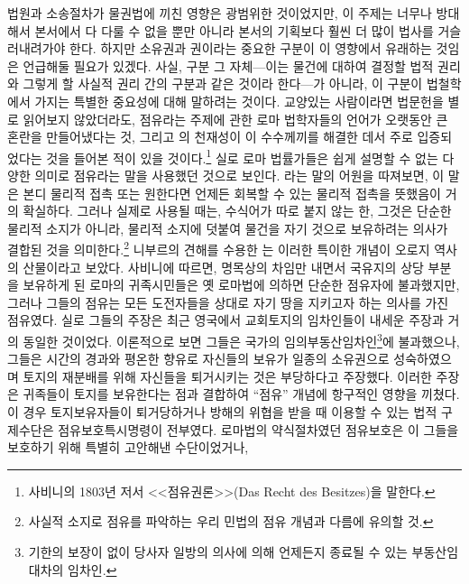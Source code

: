 법원과 소송절차가 물권법에 끼친 영향은 광범위한 것이었지만,
이 주제는 너무나 방대해서 본서에서 다 다룰 수 없을 뿐만 아니라
본서의 기획보다 훨씬 더 많이 법사를 거슬러내려가야 한다.
하지만 소유권과 권이라는 중요한 구분이 이 영향에서
유래하는 것임은 언급해둘 필요가 있겠다.
사실, 구분 그 자체---이는
물건에 대하여 결정할 법적 권리와
그렇게 할 사실적 권리 간의 구분과
같은 것이라 한다---가 아니라,
이 구분이 법철학에서 가지는 특별한 중요성에 대해 말하려는 것이다.
교양있는 사람이라면 법문헌을 별로 읽어보지 않았더라도,
점유라는 주제에 관한
로마 법학자들의 언어가 오랫동안 큰 혼란을 만들어냈다는 것,
그리고 의 천재성이 이 수수께끼를 해결한 데서
주로 입증되었다는 것을
들어본 적이 있을 것이다.\footnote{%
  사비니의 1803년 저서 <<점유권론>>(Das Recht des Besitzes)을 말한다. }
실로 로마 법률가들은
쉽게 설명할 수 없는 다양한 의미로
점유라는 말을
사용했던 것으로 보인다.
라는 말의 어원을 따져보면, 이 말은 본디
물리적 접촉 또는
원한다면 언제든 회복할 수 있는 물리적 접촉을 뜻했음이 거의 확실하다.
그러나 실제로 사용될 때는,
수식어가 따로 붙지 않는 한,
그것은 단순한 물리적 소지가 아니라,
물리적 소지에 덧붙여
물건을 자기 것으로 보유하려는 의사가 결합된 것을
의미한다.\footnote{%
  사실적 소지로 점유를 파악하는 우리 민법의 점유 개념과 다름에 유의할 것.
  }
니부르의 견해를 수용한 는
이러한 특이한 개념이 오로지 역사의 산물이라고 보았다.
사비니에 따르면,
명목상의 차임만 내면서
국유지의 상당 부분을
보유하게 된
로마의 귀족시민들은
옛 로마법에 의하면 단순한 점유자에
불과했지만, 그러나
그들의 점유는
모든 도전자들을 상대로 자기 땅을 지키고자 하는 의사를 가진 점유였다.
실로 그들의 주장은 최근 영국에서 교회토지의 임차인들이 내세운 주장과
거의 동일한 것이었다.
이론적으로 보면 그들은 국가의
%
임의부동산임차인\footnote{%
  기한의 보장이 없이
  당사자 일방의 의사에 의해 언제든지 종료될 수 있는 부동산임대차의 임차인.
}에 불과했으나,
그들은 시간의 경과와 평온한 향유로
자신들의 보유가 일종의 소유권으로 성숙하였으며
토지의 재분배를 위해 자신들을 퇴거시키는 것은 부당하다고 주장했다.
이러한 주장은 귀족들이 토지를 보유한다는 점과 결합하여
``점유'' 개념에 항구적인 영향을 끼쳤다.
이 경우
토지보유자들이
퇴거당하거나 방해의 위협을 받을 때
이용할 수 있는 법적 구제수단은
점유보호특시명령이 전부였다.
로마법의 약식절차였던 점유보호은
이 그들을 보호하기 위해 특별히 고안해낸 수단이었거나,
